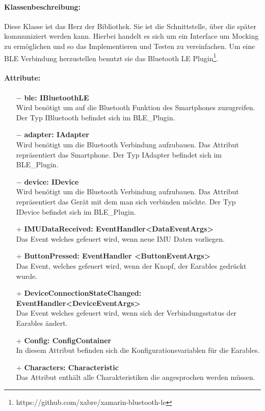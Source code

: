 \documentclass[a4paper,12pt]{article}
\begin{document}
\paragraph{Klassenbeschreibung:}
Diese Klasse ist das Herz der Bibliothek. Sie ist die Schnittstelle, über die später kommuniziert werden kann. Hierbei handelt es sich um ein Interface um Mocking zu ermöglichen und so das Implementieren und Testen zu vereinfachen. Um eine BLE Verbindung herzustellen benutzt sie das \glqq \gls{Bluetooth LE Plugin}\grqq{}\footnote{https://github.com/xabre/xamarin-bluetooth-le}.
\paragraph{Attribute:}
\begin{itemize}
	\item[$-$] \textbf{ble: IBluetoothLE}\\ Wird benötigt um auf die Bluetooth Funktion des Smartphones zuzugreifen. Der Typ IBluetooth befindet sich im BLE\_Plugin.
	\item[$-$] \textbf{adapter: IAdapter}\\ Wird benötigt um die Bluetooth Verbindung aufzubauen. Das Attribut repräsentiert das Smartphone. Der Typ  IAdapter befindet sich im BLE\_Plugin.
	\item[$-$] \textbf{device: IDevice}\\ Wird benötigt um die Bluetooth Verbindung aufzubauen. Das Attribut repräsentiert das Gerät mit dem man sich verbinden möchte. Der Typ  IDevice befindet sich im BLE\_Plugin.
	\item[+] \textbf{IMUDataReceived: EventHandler<DataEventArgs>}\\ Das Event welches gefeuert wird, wenn neue IMU Daten vorliegen.
	\item[+] \textbf{ButtonPressed: EventHandler <ButtonEventArgs>}\\ Das Event, welches gefeuert wird, wenn der Knopf, der Earables gedrückt wurde.
	\item[+] \textbf{DeviceConnectionStateChanged: EventHandler<DeviceEventArgs>}\\ Das Event welches gefeuert wird, wenn sich der Verbindungsstatus der Earables ändert.
	\item[+] \textbf{Config: ConfigContainer}\\ In diesem Attribut befinden sich die Konfigurationsvariablen für die \Gls{Earables}.
	\item[+] \textbf{Characters: Characteristic}\\ Das Attribut enthält alle Charakteristiken die angesprochen werden müssen.
\end{itemize}
\end{document}
